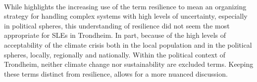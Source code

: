 \paragraph{}

While \cite{moser_turbulent_2019} highlights the increasing use of the term resilience to mean an organizing strategy for handling complex systems with high levels of uncertainty, especially in political spheres, this understanding of resilience did not seem the most appropriate for SLEs in Trondheim. In part, because of the high levels of acceptability of the climate crisis both in the local population and in the political spheres, locally, regionally and nationally. Within the political context of Trondheim, neither climate change nor sustainability are excluded terms. Keeping these terms distinct from resilience, allows for a more nuanced discussion.







